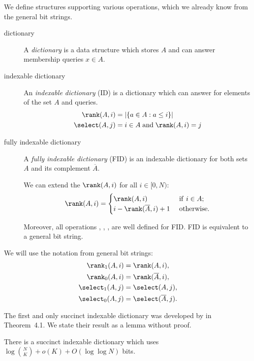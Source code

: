 We define structures supporting various operations, which we already know from the general bit strings.
\begin{description}
	\item[dictionary]
	A \emph{dictionary} is a data structure which stores $A$ and can answer membership queries $x \in A$.
	
	\item[indexable dictionary]
	An \emph{indexable dictionary} (ID) is a dictionary which can answer \rank{} for elements of the set $A$ and \select{} queries.
	\begin{align*}
		\rank(A, i) &= |\{ a \in A : a \le i \}| \\
		\select(A, j) &= i \in A \booland \rank(A, i) = j \\
	\end{align*}
	
	\item[fully indexable dictionary]
	A \emph{fully indexable dictionary} (FID) is an indexable dictionary for both sets $A$ and its complement $\overline{A}$.
	
	We can extend the $\rank(A, i)$ for all $i \in [0, N)$:
	$$ \rank(A, i) = \begin{cases}
		\rank(A, i) & \textif i \in A; \\
		i - \rank(\overline{A}, i) + 1 & \textotherwise.
	\end{cases}$$
	
	Moreover, all operations \pred{}, \succ{}, \prev{}, \nextt{} are well defined for FID.
	FID is equivalent to a general bit string.
\end{description}

We will use the notation from general bit strings:
\begin{align*}
	\rank_1(A, i) &= \rank(A, i), \\
	\rank_0(A, i) &= \rank(\overline{A}, i), \\
	\select_1(A, j) &= \select(A, j), \\
	\select_0(A, j) &= \select(\overline{A}, j). \\
\end{align*}

\bigbreak

The first and only succinct indexable dictionary was developed by \cite{raman2007succinct} in Theorem~4.1.
We state their result as a lemma without proof.

\begin{lemma}\label{l:succint-indexable-dictionary}
	There is a succinct indexable dictionary which uses $\log {N \choose K} + o(K) + O(\log \log N)$ bits.
\end{lemma}


